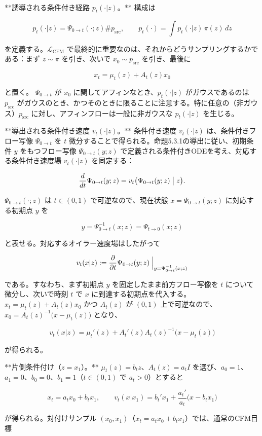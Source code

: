 **誘導される条件付き経路 $p_t(\cdot|z)$。** 構成は

\[
p_t(\cdot|z)=\Psi_{0\to t}(\cdot;z)\# p_{\mathrm{src}},\qquad
p_t(\cdot)=\int p_t(\cdot|z)\,\pi(z)\,dz
\]


を定義する。$\mathcal{L}_{\mathrm{CFM}}$ で最終的に重要なのは、それからどうサンプリングするかである：まず $z\sim\pi$ を引き、次いで $x_0\sim p_{\mathrm{src}}$ を引き、最後に

\[
x_t=\mu_t(z)+A_t(z)x_0
\]


と置く。
$\Psi_{0\to t}$ が $x_0$ に関してアフィンなとき、$p_t(\cdot|z)$ がガウスであるのは $p_{\mathrm{src}}$ がガウスのとき、かつそのときに限ることに注意する。特に任意の（非ガウス）$p_{\mathrm{src}}$ に対し、アフィンフローは一般に非ガウスな $p_t(\cdot|z)$ を生じる。

**導出される条件付き速度 $v_t(\cdot|z)$。** 条件付き速度 $v_t(\cdot|z)$ は、条件付きフロー写像 $\Psi_{0\to t}$ を $t$ 微分することで得られる。命題5.3.1の導出に従い、初期条件 $y$ をもつフロー写像 $\Psi_{0\to t}(y;z)$ で定義される条件付きODEを考え、対応する条件付き速度場 $v_t(\cdot|z)$ を同定する：

\[
\frac{d}{dt}\Psi_{0\to t}(y;z)=v_t\bigl(\Psi_{0\to t}(y;z)\bigm|z\bigr).
\]


$\Psi_{0\to t}(\cdot;z)$ は $t\in(0,1)$ で可逆なので、現在状態 $x=\Psi_{0\to t}(y;z)$ に対応する初期点 $y$ を

\[
y=\Psi_{0\to t}^{-1}(x;z)=\Psi_{t\to 0}(x;z)
\]


と表せる。対応するオイラー速度場はしたがって

\[
v_t(x|z):=\frac{\partial}{\partial t}\Psi_{0\to t}(y;z)\Bigm|_{y=\Psi_{0\to t}^{-1}(x;z)}
\]


である。すなわち、まず初期点 $y$ を固定したまま前方フロー写像を $t$ について微分し、次いで時刻 $t$ で $x$ に到達する初期点を代入する。
$x_t=\mu_t(z)+A_t(z)x_0$ かつ $A_t(z)$ が $(0,1)$ 上で可逆なので、$x_0=A_t(z)^{-1}\bigl(x-\mu_t(z)\bigr)$ となり、

\[
v_t(x|z)=\mu_t'(z)+A_t'(z)A_t(z)^{-1}\bigl(x-\mu_t(z)\bigr)
\]


が得られる。

**片側条件付け（$z=x_1$）。** $\mu_t(z)=b_t z$、$A_t(z)=a_t I$ を選び、$a_0=1$、$a_1=0$、$b_0=0$、$b_1=1$（$t\in(0,1)$ で $a_t>0$）とすると

\[
x_t=a_t x_0+b_t x_1,\qquad
v_t(x|x_1)=b_t'x_1+\frac{a_t'}{a_t}\bigl(x-b_t x_1\bigr)
\]


が得られる。対付けサンプル $(x_0,x_1)$（$x_t=a_t x_0+b_t x_1$）では、通常のCFM目標


